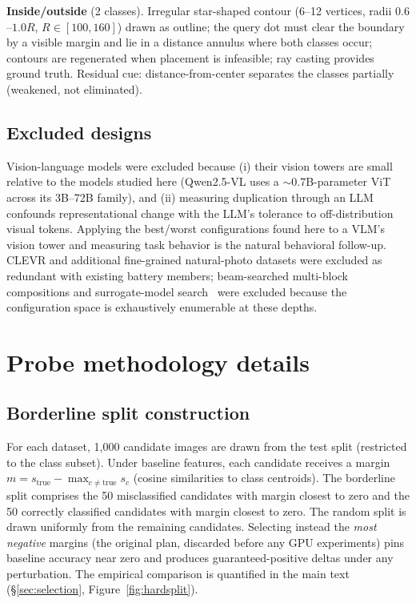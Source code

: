 \documentclass{article}
\begin{document}
\textbf{Inside/outside} (2 classes). Irregular star-shaped contour
(6--12 vertices, radii $0.6$--$1.0R$, $R \in [100,160]$) drawn as
outline; the query dot must clear the boundary by a visible margin and
lie in a distance annulus where both classes occur; contours are
regenerated when placement is infeasible; ray casting provides ground
truth. Residual cue: distance-from-center separates the classes
partially (weakened, not eliminated).

\subsection{Excluded designs}
\label{app:excluded}
Vision-language models were excluded because (i) their vision towers are
small relative to the models studied here (Qwen2.5-VL uses a
$\sim$0.7B-parameter ViT across its 3B--72B family), and (ii) measuring
duplication through an LLM confounds representational change with the
LLM's tolerance to off-distribution visual tokens. Applying the
best/worst configurations found here to a VLM's vision tower and
measuring task behavior is the natural behavioral follow-up. CLEVR and
additional fine-grained natural-photo datasets were excluded as
redundant with existing battery members; beam-searched multi-block
compositions and surrogate-model search~\citep{hankins2025rysii} were
excluded because the configuration space is exhaustively enumerable at
these depths.

\section{Probe methodology details}
\label{app:probemeth}

\subsection{Borderline split construction}
\label{app:selection}
For each dataset, 1{,}000 candidate images are drawn from the test split
(restricted to the class subset). Under baseline features, each candidate
receives a margin $m = s_{\mathrm{true}} - \max_{c \ne \mathrm{true}}
s_c$ (cosine similarities to class centroids). The borderline split
comprises the 50 misclassified candidates with margin closest to zero
and the 50 correctly classified candidates with margin closest to zero.
The random split is drawn uniformly from the remaining candidates.
Selecting instead the \emph{most negative} margins (the original plan,
discarded before any GPU experiments) pins baseline accuracy near zero
and produces guaranteed-positive deltas under any perturbation. The
empirical comparison is quantified in the main text
(\S\ref{sec:selection}, Figure~\ref{fig:hardsplit}).
\end{document}
